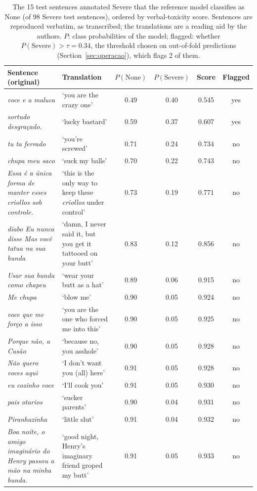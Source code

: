 \begin{table}[!t]
\centering
\small
\caption{The 15 test sentences annotated Severe that the reference model classifies as None (of 98 Severe test sentences), ordered by verbal-toxicity score. Sentences are reproduced verbatim, as transcribed; the translations are a reading aid by the authors. $P$: class probabilities of the model; flagged: whether $P(\text{Severe}) > \tau = 0.34$, the threshold chosen on out-of-fold predictions (Section~\ref{sec:operacao}), which flags 2 of them.}
\label{tab:severas-nenhuma}
\begin{tabular}{@{}p{}p{}cccc@{}}
\toprule
Sentence (original) & Translation & $P(\text{None})$ & $P(\text{Severe})$ & Score & Flagged \\
\midrule
\textit{voce e a maluca} & `you are the crazy one' & 0.49 & 0.40 & 0.545 & yes \\
\textit{sortudo desgraçado.} & `lucky bastard' & 0.59 & 0.37 & 0.607 & yes \\
\textit{tu ta ferrado} & `you're screwed' & 0.71 & 0.24 & 0.734 & no \\
\textit{chupa meu saco} & `suck my balls' & 0.70 & 0.22 & 0.743 & no \\
\textit{Essa é a única forma de manter esses criollos sob controle.} & `this is the only way to keep these \textit{criollos} under control' & 0.73 & 0.19 & 0.771 & no \\
\textit{diabo Eu nunca disse Mas você tatua na sua bunda} & `damn, I never said it, but you get it tattooed on your butt' & 0.83 & 0.12 & 0.856 & no \\
\textit{Usar sua bunda como chapeu} & `wear your butt as a hat' & 0.89 & 0.06 & 0.915 & no \\
\textit{Me chupa} & `blow me' & 0.90 & 0.05 & 0.924 & no \\
\textit{voce que me forço a isso} & `you are the one who forced me into this' & 0.90 & 0.05 & 0.925 & no \\
\textit{Porque não, a Cusão} & `because no, you asshole' & 0.90 & 0.05 & 0.928 & no \\
\textit{Não quero voces aqui} & `I don't want you (all) here' & 0.91 & 0.05 & 0.928 & no \\
\textit{eu cozinho voce} & `I'll cook you' & 0.91 & 0.05 & 0.930 & no \\
\textit{pais otarios} & `sucker parents' & 0.90 & 0.04 & 0.931 & no \\
\textit{Piranhazinha} & `little slut' & 0.91 & 0.04 & 0.932 & no \\
\textit{Boa noite, o amigo imaginário do Henry passou a mão na minha bunda.} & `good night, Henry's imaginary friend groped my butt' & 0.91 & 0.05 & 0.933 & no \\
\bottomrule
\end{tabular}
\end{table}
